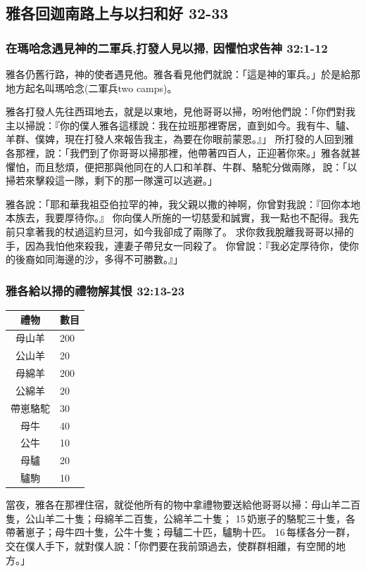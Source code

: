 \subsection{雅各回迦南路上与以扫和好 32-33}
\subsubsection{在瑪哈念遇見神的二軍兵,打發人見以掃, 因懼怕求告神 32:1-12}
雅各仍舊行路，神的使者遇見他。雅各看見他們就說：「這是神的軍兵。」於是給那地方起名叫瑪哈念(二軍兵two camps)。

雅各打發人先往西珥地去，就是以東地，見他哥哥以掃，吩咐他們說：「你們對我主以掃說：『你的僕人雅各這樣說：我在拉班那裡寄居，直到如今。我有牛、驢、羊群、僕婢，現在打發人來報告我主，為要在你眼前蒙恩。』」 
所打發的人回到雅各那裡，說：「我們到了你哥哥以掃那裡，他帶著四百人，正迎著你來。」雅各就甚懼怕，而且愁煩，便把那與他同在的人口和羊群、牛群、駱駝分做兩隊， 說：「以掃若來擊殺這一隊，剩下的那一隊還可以逃避。」


雅各說：「耶和華我祖亞伯拉罕的神，我父親以撒的神啊，你曾對我說：『回你本地本族去，我要厚待你。』 
你向僕人所施的一切慈愛和誠實，我一點也不配得。我先前只拿著我的杖過這約旦河，如今我卻成了兩隊了。 
求你救我脫離我哥哥以掃的手，因為我怕他來殺我，連妻子帶兒女一同殺了。
你曾說：『我必定厚待你，使你的後裔如同海邊的沙，多得不可勝數。』」 


\subsubsection{雅各給以掃的禮物解其恨 32:13-23}
\begin{table}\centering
\begin{tabular}{c|l   }\hline\hline
禮物 & 數目                    \\\hline
母山羊&200 \\\hline
公山羊       &20\\\hline
母綿羊 & 200\\\hline
公綿羊 & 20\\\hline
帶崽駱駝&30\\\hline
母牛 &40\\\hline
公牛 &10\\\hline
母驢 & 20\\\hline
驢駒 &10\\\hline
\end{tabular}
\end{table}
當夜，雅各在那裡住宿，就從他所有的物中拿禮物要送給他哥哥以掃：母山羊二百隻，公山羊二十隻；母綿羊二百隻，公綿羊二十隻； 15 奶崽子的駱駝三十隻，各帶著崽子；母牛四十隻，公牛十隻；母驢二十匹，驢駒十匹。 16 每樣各分一群，交在僕人手下，就對僕人說：「你們要在我前頭過去，使群群相離，有空閒的地方。」

